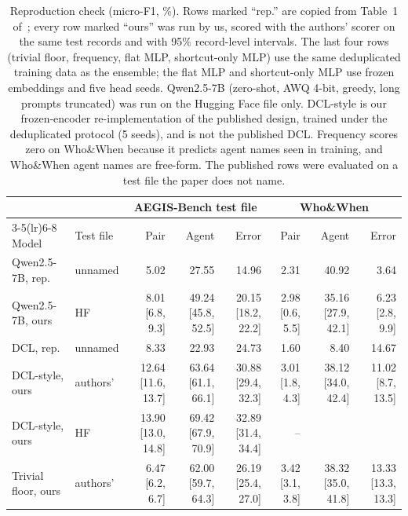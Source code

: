\begin{table}[t]
\caption{Reproduction check (micro-F1, \%). Rows marked ``rep.'' are copied from Table~1 of~\cite{aegis}; every row marked ``ours'' was run by us, scored with the authors' scorer on the same test records and with 95\% record-level intervals. The last four rows (trivial floor, frequency, flat MLP, shortcut-only MLP) use the same deduplicated training data as the ensemble; the flat MLP and shortcut-only MLP use frozen embeddings and five head seeds. Qwen2.5-7B (zero-shot, AWQ 4-bit, greedy, long prompts truncated) was run on the Hugging Face file only. DCL-style is our frozen-encoder re-implementation of the published design, trained under the deduplicated protocol (5 seeds), and is not the published DCL. Frequency scores zero on Who\&When because it predicts agent names seen in training, and Who\&When agent names are free-form. The published rows were evaluated on a test file the paper does not name.}
\label{tab:repro}
\centering\footnotesize\setlength{\tabcolsep}{3pt}
\begin{tabular}{@{}llrrrrrr@{}}
\toprule
 & & \multicolumn{3}{c}{AEGIS-Bench test file} & \multicolumn{3}{c}{Who\&When} \\
\cmidrule(lr){3-5}\cmidrule(lr){6-8}
Model & Test file & Pair & Agent & Error & Pair & Agent & Error \\
\midrule
Qwen2.5-7B, rep. & unnamed & 5.02 & 27.55 & 14.96 & 2.31 & 40.92 & 3.64 \\
Qwen2.5-7B, ours & HF & 8.01 {\scriptsize[6.8, 9.3]} & 49.24 {\scriptsize[45.8, 52.5]} & 20.15 {\scriptsize[18.2, 22.2]} & 2.98 {\scriptsize[0.6, 5.5]} & 35.16 {\scriptsize[27.9, 42.1]} & 6.23 {\scriptsize[2.8, 9.9]} \\
\midrule
DCL, rep. & unnamed & 8.33 & 22.93 & 24.73 & 1.60 & 8.40 & 14.67 \\
DCL-style, ours & authors' & 12.64 {\scriptsize[11.6, 13.7]} & 63.64 {\scriptsize[61.1, 66.1]} & 30.88 {\scriptsize[29.4, 32.3]} & 3.01 {\scriptsize[1.8, 4.3]} & 38.12 {\scriptsize[34.0, 42.4]} & 11.02 {\scriptsize[8.7, 13.5]} \\
DCL-style, ours & HF & 13.90 {\scriptsize[13.0, 14.8]} & 69.42 {\scriptsize[67.9, 70.9]} & 32.89 {\scriptsize[31.4, 34.4]} & -- \\
\midrule
Trivial floor, ours & authors' & 6.47 {\scriptsize[6.2, 6.7]} & 62.00 {\scriptsize[59.7, 64.3]} & 26.19 {\scriptsize[25.4, 27.0]} & 3.42 {\scriptsize[3.1, 3.8]} & 38.32 {\scriptsize[35.0, 41.8]} & 13.33 {\scriptsize[13.3, 13.3]} \\

\end{tabular}
\end{table}
